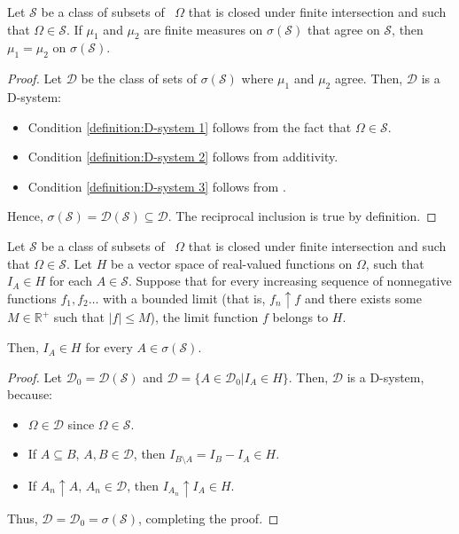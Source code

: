 \begin{corl}\label{corollary:measures agree on a class of sets closed by intersection}
		Let \(\mathcal{S}\) be a class of subsets of ~\(\Omega\) that is closed under finite intersection and such that \(\Omega\in\mathcal{S}\). If \(\mu_1\) and \(\mu_2\) are finite measures on \(\sigma(\mathcal{S})\) that agree on \(\mathcal{S}\), then \(\mu_1=\mu_2\) on \(\sigma(\mathcal{S})\).
\end{corl}
\begin{proof}
		Let \(\mathcal{D}\) be the class of sets of \(\sigma(\mathcal{S})\) where \(\mu_1\) and \(\mu_2\) agree. Then, \(\mathcal{D}\) is a D-system:
		\begin{itemize}
				\item Condition \ref{definition:D-system 1} follows from the fact that \(\Omega\in\mathcal{S}\).
				\item Condition \ref{definition:D-system 2} follows from additivity.
				\item Condition \ref{definition:D-system 3} follows from .
		\end{itemize}
		Hence, \(\sigma(\mathcal{S})=\mathcal{D}(\mathcal{S})\subseteq\mathcal{D}\). The reciprocal inclusion is true by definition.
\end{proof}
\begin{corl}
		Let \(\mathcal{S}\) be a class of subsets of ~\(\Omega\) that is closed under finite intersection and such that \(\Omega\in\mathcal{S}\). Let \(H\) be a vector space of real-valued functions on \(\Omega\), such that \(I_A\in H\) for each \(A\in\mathcal{S}\). Suppose that for every increasing sequence of nonnegative functions \(f_1,f_2\dots\) with a bounded limit (that is, \(f_n\uparrow f\) and there exists some \(M\in\mathbb{R}^+\) such that \(\left|f\right|\leq M\)), the limit function \(f\) belongs to \(H\).

		Then, \(I_A\in H\) for every \(A\in\sigma(\mathcal{S})\).
\end{corl}
\begin{proof}
		Let \(\mathcal{D}_0=\mathcal{D}(\mathcal{S})\) and \(\mathcal{D}=\{A\in\mathcal{D}_0\left|I_A\in H\right.\}\). Then, \(\mathcal{D}\) is a D-system, because:
		\begin{itemize}
				\item \(\Omega\in\mathcal{D}\) since \(\Omega\in\mathcal{S}\).
				\item If \(A\subseteq B\), \(A,B\in\mathcal{D}\), then \(I_{B\setminus A}=I_B-I_A\in H\).
				\item If \(A_n\uparrow A\), \(A_n\in\mathcal{D}\), then \(I_{A_n}\uparrow I_A\in H\).
		\end{itemize}
		Thus, \(\mathcal{D}=\mathcal{D}_0=\sigma(\mathcal{S})\), completing the proof.
\end{proof}
